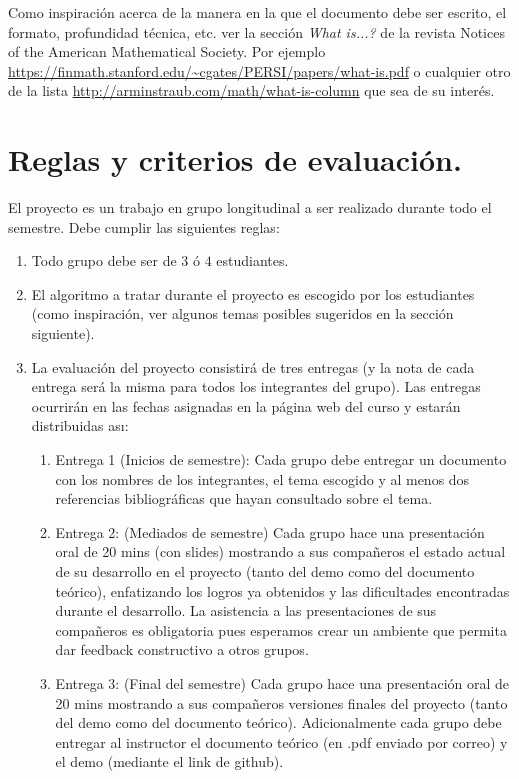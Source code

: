 \documentclass[12pt, a4paper]{article}
\begin{document}
Como inspiraci\'on acerca de la manera en la que el documento debe ser escrito, el formato, profundidad t\'ecnica, etc. ver la secci\'on {\it What is...?} de la revista Notices of the American Mathematical Society. Por ejemplo \url{https://finmath.stanford.edu/~cgates/PERSI/papers/what-is.pdf} o cualquier otro de la lista \url{http://arminstraub.com/math/what-is-column} que sea de su inter\'es.



\section{Reglas y criterios de evaluaci\'on.}
El proyecto es un trabajo en grupo longitudinal a ser realizado durante todo el semestre. Debe cumplir las siguientes reglas:

\begin{enumerate}

\item Todo grupo debe ser de $3$ \'o $4$ estudiantes.
\item El algoritmo a tratar durante el proyecto es escogido por los estudiantes (como inspiración, ver algunos temas posibles sugeridos en la secci\'on siguiente).
\item La evaluaci\'on del proyecto consistir\'a de tres entregas (y la nota de cada entrega ser\'a la misma para todos los integrantes del grupo). Las entregas ocurrir\'an en las fechas asignadas en la p\'agina web del curso y estar\'an distribuidas as\i:
\begin{enumerate}
\item Entrega 1 (Inicios de semestre): Cada grupo debe entregar un documento con los nombres de los integrantes, el tema escogido y al menos dos referencias bibliogr\'aficas que hayan consultado sobre el tema.
\item Entrega 2: (Mediados de semestre) Cada grupo hace una presentaci\'on oral de 20 mins (con slides) mostrando a sus compa\~neros el estado actual de su desarrollo en el proyecto (tanto del demo como del documento te\'orico), enfatizando los logros ya obtenidos y las dificultades encontradas durante el desarrollo. La asistencia a las presentaciones de sus compa\~neros es obligatoria pues esperamos crear un ambiente que permita dar feedback constructivo a otros grupos.
\item Entrega 3: (Final del semestre) Cada grupo hace una presentaci\'on oral de 20 mins mostrando a sus compa\~neros versiones finales del proyecto (tanto del demo como del documento te\'orico).  Adicionalmente cada grupo debe entregar al instructor el documento te\'orico (en .pdf enviado por correo) y el demo (mediante el link de github).
\end{enumerate}
\end{enumerate}
\end{document}
